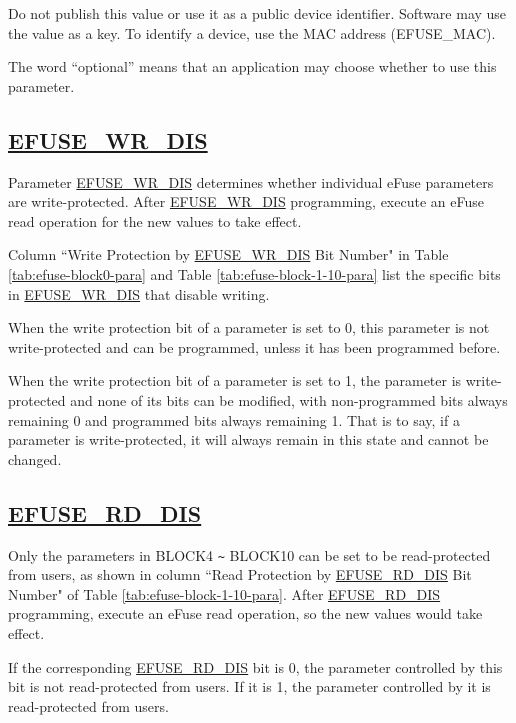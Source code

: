 \documentclass[main\_\_EN.tex]{subfiles}
\begin{document}
Do not publish this value or use it as a public device identifier. Software may use the value as a key. To identify a device, use the MAC address (EFUSE\_MAC).

The word ``optional'' means that an application may choose whether to use this parameter.

\subsection{\hyperref[fielddesc:EFUSEWRDIS]{EFUSE\_WR\_DIS}}
\label{sec:efuse-wr-dis}

Parameter \hyperref[fielddesc:EFUSEWRDIS]{EFUSE\_WR\_DIS} determines whether individual eFuse parameters are write-protected. After \hyperref[fielddesc:EFUSEWRDIS]{EFUSE\_WR\_DIS} programming, execute an eFuse read operation for the new values to take effect.

Column ``Write Protection by \hyperref[fielddesc:EFUSEWRDIS]{EFUSE\_WR\_DIS} Bit Number" in Table \ref{tab:efuse-block0-para} and Table \ref{tab:efuse-block-1-10-para} list the specific bits in \hyperref[fielddesc:EFUSEWRDIS]{EFUSE\_WR\_DIS} that disable writing.

When the write protection bit of a parameter is set to 0, this parameter is not write-protected and can be programmed, unless it has been programmed before.

When the write protection bit of a parameter is set to 1, the parameter is write-protected and none of its bits can be modified, with non-programmed bits always remaining 0 and programmed bits always remaining 1. That is to say, if a parameter is write-protected, it will always remain in this state and cannot be changed.

\subsection{\hyperref[fielddesc:EFUSERDDIS]{EFUSE\_RD\_DIS}}
\label{sec:efuse-rd-dis}

Only the parameters in BLOCK4 \verb+~+ BLOCK10 can be set to be read-protected from users, as shown in column ``Read Protection by \hyperref[fielddesc:EFUSERDDIS]{EFUSE\_RD\_DIS} Bit Number" of Table \ref{tab:efuse-block-1-10-para}. After \hyperref[fielddesc:EFUSERDDIS]{EFUSE\_RD\_DIS} programming, execute an eFuse read operation, so the new values would take effect.

If the corresponding \hyperref[fielddesc:EFUSERDDIS]{EFUSE\_RD\_DIS} bit is 0, the parameter controlled by this bit is not read-protected from users. If it is 1, the parameter controlled by it is read-protected from users.
\end{document}
